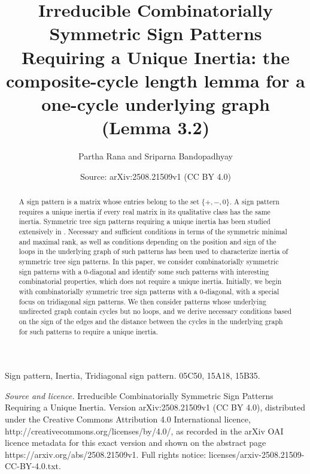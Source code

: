 \documentclass[10pt,a4paper]{amsart}
\title[Irreducible Combinatorially Symmetric Sign Patterns]{Irreducible Combinatorially Symmetric Sign Patterns Requiring a Unique Inertia: the composite-cycle length lemma for a one-cycle underlying graph (Lemma 3.2)}
\author{Partha Rana and Sriparna Bandopadhyay}
\date{Source: arXiv:2508.21509v1 (CC BY 4.0)}
\numberwithin{equation}{section}
\begin{document}
\begin{abstract}
A sign pattern is a matrix whose entries belong to the set $\{+,-,0\}$. A sign pattern requires a unique inertia if every real matrix in its qualitative class has the same inertia. Symmetric tree sign patterns requiring a unique inertia has been studied extensively in \cite{2001, 2001a, 2018}. Necessary and sufficient conditions in terms of the symmetric minimal and maximal rank, as well as conditions depending on the position and sign of the loops in the underlying graph of such patterns has been used to characterize inertia of symmetric tree sign patterns. In this paper, we consider combinatorially symmetric sign patterns with a $0$-diagonal and identify some such patterns with interesting combinatorial properties, which does not require a unique inertia. Initially, we begin with combinatorially symmetric tree sign patterns with a $0$-diagonal, with a special focus on tridiagonal sign patterns. We then consider patterns whose underlying undirected graph contain cycles but no loops, and we derive necessary conditions based on the sign of the edges and the distance between the cycles in the underlying graph for such patterns to require a unique inertia.
\end{abstract}
 Sign pattern, Inertia, Tridiagonal sign pattern.
 05C50, 15A18, 15B35.
\maketitle
\noindent\emph{Source and licence.} Irreducible Combinatorially Symmetric Sign Patterns Requiring a Unique Inertia. Version arXiv:2508.21509v1 (CC BY 4.0), distributed under the Creative Commons Attribution 4.0 International licence, http://creativecommons.org/licenses/by/4.0/, as recorded in the arXiv OAI licence metadata for this exact version and shown on the abstract page https://arxiv.org/abs/2508.21509v1. Full rights notice: licenses/arxiv-2508.21509-CC-BY-4.0.txt.\par\smallskip
\end{document}
